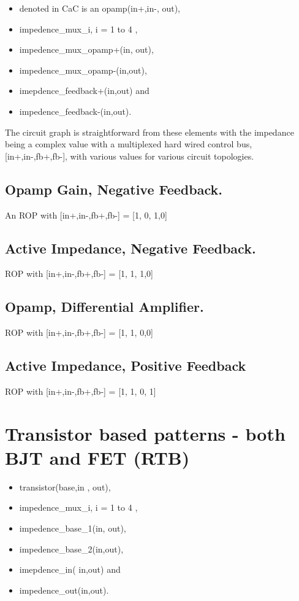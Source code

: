 \documentclass[conference]{IEEEtran}
\begin{document}
\begin{itemize}
\item denoted in CaC is an opamp(in+,in-, out),
\item impedence_mux_i,  i = 1 to 4 ,
\item impedence_mux_opamp+(in, out),
\item impedence_mux_opamp-(in,out),
\item imepdence_feedback+(in,out) and
\item impedence_feedback-(in,out).
\end{itemize}

The circuit graph is straightforward from
these elements with the impedance being a
complex value with a multiplexed hard
wired control bus, [in+,in-,fb+,fb-], with
various values for various circuit topologies.
\subsection{Opamp Gain, Negative Feedback.}
An ROP with [in+,in-,fb+,fb-] = [1, 0, 1,0]
\subsection{Active Impedance, Negative Feedback.}
ROP with [in+,in-,fb+,fb-] = [1, 1, 1,0]
\subsection{Opamp, Differential Amplifier.}
ROP with [in+,in-,fb+,fb-] = [1, 1, 0,0]
\subsection{Active Impedance, Positive Feedback}
ROP with [in+,in-,fb+,fb-] = [1, 1, 0, 1]


\section{Transistor based patterns -  both
BJT and FET  (RTB)}

\begin{itemize}
\item transistor(base,in , out), 
\item impedence_mux_i, i = 1 to 4 ,
\item impedence_base_1(in, out),
\item impedence_base_2(in,out),
\item imepdence_in( in,out) and
\item impedence_out(in,out).
\end{itemize}
\end{document}
